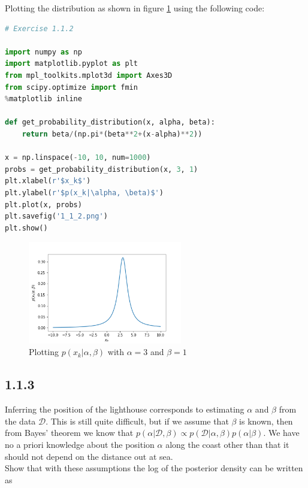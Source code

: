 \documentclass[a4paper]{article}
\begin{document}
Plotting the distribution as shown in figure \ref{fig:112} using the following code:

\begin{lstlisting}[language=Python]
# Exercise 1.1.2

import numpy as np
import matplotlib.pyplot as plt 
from mpl_toolkits.mplot3d import Axes3D
from scipy.optimize import fmin
%matplotlib inline

def get_probability_distribution(x, alpha, beta):
    return beta/(np.pi*(beta**2+(x-alpha)**2))
    
x = np.linspace(-10, 10, num=1000) 
probs = get_probability_distribution(x, 3, 1) 
plt.xlabel(r'$x_k$')
plt.ylabel(r'$p(x_k|\alpha, \beta)$')
plt.plot(x, probs)
plt.savefig('1_1_2.png')
plt.show()    
\end{lstlisting}

\begin{figure}[H]
\center
\includegraphics[width=0.6\textwidth]{Images/1_1_2.png}
\caption{Plotting $p(x_k | \alpha, \beta)$ with $\alpha = 3$ and $\beta = 1$}
\label{fig:112}
\end{figure}

\subsection*{1.1.3}

Inferring the position of the lighthouse corresponds to estimating $\alpha$ and $\beta$ from the data $\mathcal{D}$. This is still quite difficult, but if we assume that $\beta$ is known, then from Bayes’ theorem we know that $p(\alpha|\mathcal{D}, \beta) \propto p(\mathcal{D}|\alpha, \beta) p(\alpha|\beta)$. We have no a priori knowledge about the position $\alpha$ along the coast other than that it should not depend on the distance out at sea.\\

Show that with these assumptions the log of the posterior density can be written as
\end{document}
